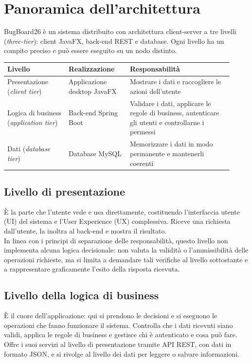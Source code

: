 \section{Panoramica dell'architettura}
BugBoard26 è un sistema distribuito con architettura client-server a tre livelli (\textit{three-tier}): client JavaFX, back-end REST e database. Ogni livello ha un compito preciso e può essere eseguito su un nodo distinto.

\begin{center}
\renewcommand{\arraystretch}{1.6}
\begin{tabular}{|p{0.25\linewidth}|p{0.25\linewidth}|p{0.42\linewidth}|}
\hline
\textbf{Livello} & \textbf{Realizzazione} & \textbf{Responsabilità} \\
\hline
Presentazione (\textit{client tier}) & Applicazione desktop JavaFX & Mostrare i dati e raccogliere le azioni dell'utente \\
\hline
Logica di business (\textit{application tier}) & Back-end Spring Boot & Validare i dati, applicare le regole di business, autenticare gli utenti e controllarne i permessi \\
\hline
Dati (\textit{database tier}) & Database MySQL & Memorizzare i dati in modo permanente e mantenerli coerenti \\
\hline
\end{tabular}
\end{center}

\subsection{Livello di presentazione}
È la parte che l'utente vede e usa direttamente, costituendo l'interfaccia utente (UI) del sistema e l'User Experience (UX) complessiva. Riceve una richiesta dall'utente, la inoltra al back-end e mostra il risultato. \\
In linea con i principi di separazione delle responsabilità, questo livello non implementa alcuna logica decisionale: non valuta la validità o l'ammissibilità delle operazioni richieste, ma si limita a demandare tali verifiche al livello sottostante e a rappresentare graficamente l'esito della risposta ricevuta.

\subsection{Livello della logica di business}
È il cuore dell'applicazione: qui si prendono le decisioni e si eseguono le operazioni che fanno funzionare il sistema. Controlla che i dati ricevuti siano validi, applica le regole di business e gestisce chi è autenticato e cosa può fare. Offre i suoi servizi al livello di presentazione tramite API REST, con dati in formato JSON, e si rivolge al livello dei dati per leggere o salvare informazioni.

